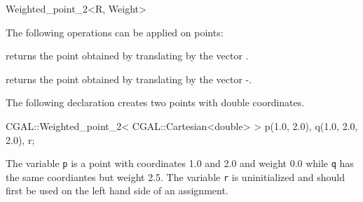 \begin{ccRefClass} {Weighted_point_2<R, Weight>}

The following operations can be applied on points:


       {returns the point obtained by translating  by the 
        vector .}

       {returns the point obtained by translating  by the 
        vector -.}

\ccExample

The following declaration creates two points with  double coordinates.

\begin{cprog}

  CGAL::Weighted_point_2< CGAL::Cartesian<double> > p(1.0, 2.0), q(1.0, 2.0, 2.0), r;
\end{cprog} 

The variable \texttt{p} is a point with 
coordinates 1.0 and 2.0 and weight 0.0 while \texttt{q} has the same 
coordiantes but weight 2.5.
The variable {\tt r} is uninitialized and should first be used on 
the left hand side of an assignment. 

\ccSeeAlso
{} \\

\end{ccRefClass} 
